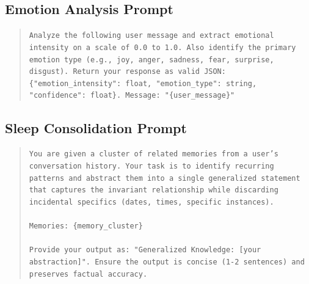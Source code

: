 \documentclass[11pt]{article}
\begin{document}
\subsection{Emotion Analysis Prompt}
\begin{quote}
\small
\texttt{Analyze the following user message and extract emotional intensity on a scale of 0.0 to 1.0. Also identify the primary emotion type (e.g., joy, anger, sadness, fear, surprise, disgust). Return your response as valid JSON: \{"emotion\_intensity": float, "emotion\_type": string, "confidence": float\}. Message: "\{user\_message\}"}
\end{quote}

\subsection{Sleep Consolidation Prompt}
\begin{quote}
\small
\texttt{You are given a cluster of related memories from a user's conversation history. Your task is to identify recurring patterns and abstract them into a single generalized statement that captures the invariant relationship while discarding incidental specifics (dates, times, specific instances). \\
\\
Memories: \{memory\_cluster\} \\
\\
Provide your output as: "Generalized Knowledge: [your abstraction]". Ensure the output is concise (1-2 sentences) and preserves factual accuracy.}
\end{quote}
\end{document}
